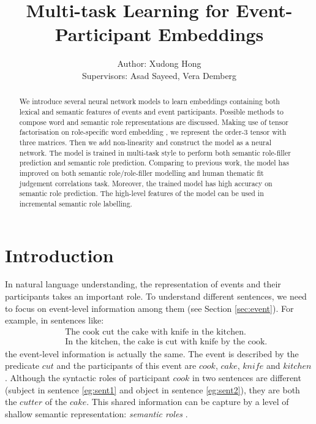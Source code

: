 \documentclass[a4paper]{article}
\title{Multi-task Learning for Event-Participant Embeddings}
\author{Author: Xudong Hong \\ 
Supervisors: Asad Sayeed, Vera Demberg}
\begin{document}
\maketitle


\begin{abstract}
\noindent
We introduce several neural network models to learn embeddings containing both lexical and semantic features of events and event participants. Possible methods to compose word and semantic role representations are discussed. Making use of tensor factorisation on role-specific word embedding \citep{tilk2016event}, we represent the order-3 tensor with three matrices. Then we add non-linearity and construct the model as a neural network. The model is trained in multi-task style to perform both semantic role-filler prediction and semantic role prediction. Comparing to previous work, the model has improved on both semantic role/role-filler modelling and human thematic fit judgement correlations task. Moreover, the trained model has high accuracy on semantic role prediction. The high-level features of the model can be used in incremental semantic role labelling.  
\end{abstract}



\section{Introduction} \label{sec:intro}
In natural language understanding, the representation of events and their participants takes an important role. To understand different sentences, we need to focus on event-level information among them  (see Section \ref{sec:event}). For example, in sentences like: 
\begin{eqnarray}
    & &\text{The cook cut the cake with knife in the kitchen.}        \label{eg:sent1} \\   
    & &\text{In the kitchen, the cake is cut with knife by the cook.} \label{eg:sent2}
\end{eqnarray}
the event-level information is actually the same. The event is described by the predicate $cut$ and the participants of this event are $cook$, $cake$, $knife$ and $kitchen$. Although the syntactic roles of participant $cook$ in two sentences are different (subject in sentence \eqref{eg:sent1} and object in sentence \eqref{eg:sent2}), they are both the $cutter$ of the $cake$. This shared information can be capture by a level of shallow semantic representation: \textit{semantic roles} \citep{jurafsky2014speech}. 
\end{document}
